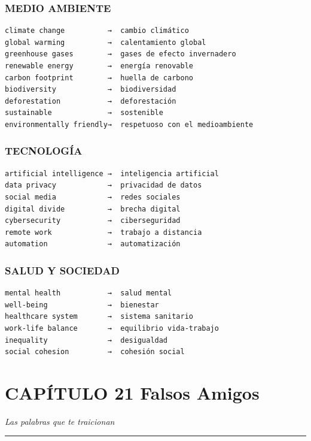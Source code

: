 \documentclass[
  spanish,
  letterpaper,
]{scrbook}
\begin{document}
\subsection{MEDIO AMBIENTE}\label{medio-ambiente}

\begin{verbatim}
climate change          →  cambio climático
global warming          →  calentamiento global
greenhouse gases        →  gases de efecto invernadero
renewable energy        →  energía renovable
carbon footprint        →  huella de carbono
biodiversity            →  biodiversidad
deforestation           →  deforestación
sustainable             →  sostenible
environmentally friendly→  respetuoso con el medioambiente
\end{verbatim}

\subsection{TECNOLOGÍA}\label{tecnologuxeda}

\begin{verbatim}
artificial intelligence →  inteligencia artificial
data privacy            →  privacidad de datos
social media            →  redes sociales
digital divide          →  brecha digital
cybersecurity           →  ciberseguridad
remote work             →  trabajo a distancia
automation              →  automatización
\end{verbatim}

\subsection{SALUD Y SOCIEDAD}\label{salud-y-sociedad}

\begin{verbatim}
mental health           →  salud mental
well-being              →  bienestar
healthcare system       →  sistema sanitario
work-life balance       →  equilibrio vida-trabajo
inequality              →  desigualdad
social cohesion         →  cohesión social
\end{verbatim}

\chapter{CAPÍTULO 21 Falsos Amigos}\label{capuxedtulo-21-falsos-amigos}

\emph{Las palabras que te traicionan}

\begin{center}\rule{0.5\linewidth}{0.5pt}\end{center}
\end{document}
